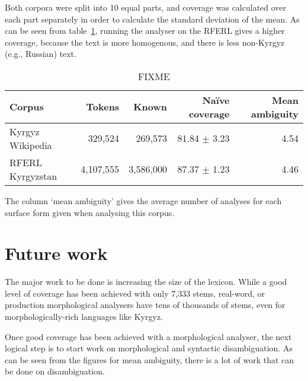 \documentclass[a4paper,12pt,onecolumn,oneside]{article}
\begin{document}
Both corpora were split into 10 equal parts, and coverage was calculated over each part separately in order to calculate the standard deviation of the mean. As can be seen from table~\ref{table:cov}, running the analyser on the RFERL gives a higher coverage, because the text is more homogenous, and there is less non-Kyrgyz (e.g., Russian) text.

\begin{table}
	\centering
	\begin{tabular}{lrrrr}
		\toprule
		Corpus           & Tokens    & Known     & Naïve coverage    & Mean ambiguity\\
		\midrule
		Kyrgyz Wikipedia & 329,524   & 269,573   & 81.84 $\pm$ 3.23  & 4.54\\
		RFERL Kyrgyzstan & 4,107,555 & 3,586,000 & 87.37 $\pm$ 1.23  & 4.46\\
		\bottomrule
	\end{tabular}
	\caption{FIXME}
	\label{table:cov}
\end{table}

The column `mean ambiguity' gives the average number of analyses for each surface form given when analysing this corpus.

\section{Future work}

The major work to be done is increasing the size of the lexicon. While a good level of coverage has been achieved with only 7,333 stems, real-word, or production morphological analysers have tens of thousands of stems, even for morphologically-rich languages like Kyrgyz.

Once good coverage has been achieved with a morphological analyser, the next logical step is to start work on morphological and syntactic disambiguation. As can be seen from the figures for mean ambiguity, there is a lot of work that can be done on disambiguation.





\end{document}
